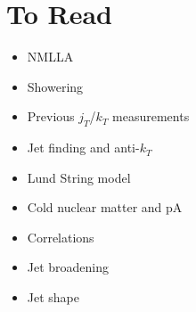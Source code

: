 \documentclass[12pt]{article}
\begin{document}
\section{To Read}
\begin{itemize}
\item NMLLA~\cite{nmlla}
\item Showering~\cite{Gieseke:2003rz}
\item Previous $j_T$/$k_T$ measurements~\cite{cdfpaper,atlaksenJetit}
\item Jet finding and anti-$k_T$~\cite{antikt}
\item Lund String model~\cite{lundString}
\item Cold nuclear matter and pA~\cite{cnmEffect,protonNucleusOpportunities,Adam:2015hoa}
\item Correlations~\cite{thorstenBiasProceedings,Renk:2011wp}
\item Jet broadening~\cite{jetBroadeningPpb1,jetBroadeningAA,antiangularOrdering}
\item Jet shape~\cite{jetShapeQGP,Acharya:2017okq}
\end{itemize}

%
%


\end{document}

